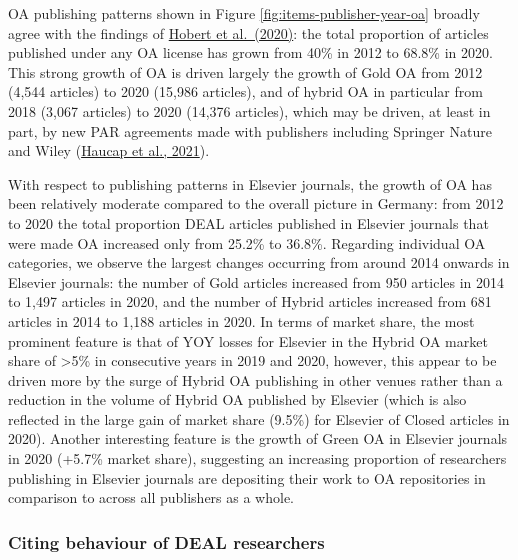 \documentclass[
]{article}
\begin{document}
OA publishing patterns shown in Figure \ref{fig:items-publisher-year-oa} broadly agree with the findings of \href{http://doi.org/10.5281/zenodo.3892951}{Hobert et al.~(2020)}: the total proportion of articles published under any OA license has grown from 40\% in 2012 to 68.8\% in 2020. This strong growth of OA is driven largely the growth of Gold OA from 2012 (4,544 articles) to 2020 (15,986 articles), and of hybrid OA in particular from 2018 (3,067 articles) to 2020 (14,376 articles), which may be driven, at least in part, by new PAR agreements made with publishers including Springer Nature and Wiley (\href{https://www.dice.hhu.de/fileadmin/redaktion/Fakultaeten/Wirtschaftswissenschaftliche_Fakultaet/DICE/Discussion_Paper/360_Haucap_Moshgbar_Schmal.pdf}{Haucap et al., 2021}).

With respect to publishing patterns in Elsevier journals, the growth of OA has been relatively moderate compared to the overall picture in Germany: from 2012 to 2020 the total proportion DEAL articles published in Elsevier journals that were made OA increased only from 25.2\% to 36.8\%. Regarding individual OA categories, we observe the largest changes occurring from around 2014 onwards in Elsevier journals: the number of Gold articles increased from 950 articles in 2014 to 1,497 articles in 2020, and the number of Hybrid articles increased from 681 articles in 2014 to 1,188 articles in 2020. In terms of market share, the most prominent feature is that of YOY losses for Elsevier in the Hybrid OA market share of \textgreater5\% in consecutive years in 2019 and 2020, however, this appear to be driven more by the surge of Hybrid OA publishing in other venues rather than a reduction in the volume of Hybrid OA published by Elsevier (which is also reflected in the large gain of market share (9.5\%) for Elsevier of Closed articles in 2020). Another interesting feature is the growth of Green OA in Elsevier journals in 2020 (+5.7\% market share), suggesting an increasing proportion of researchers publishing in Elsevier journals are depositing their work to OA repositories in comparison to across all publishers as a whole.

\hypertarget{citing-behaviour-of-deal-researchers}{%
\subsubsection{Citing behaviour of DEAL researchers}\label{citing-behaviour-of-deal-researchers}}
\end{document}
